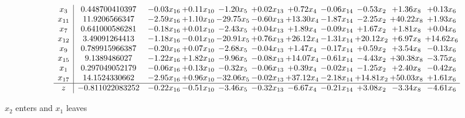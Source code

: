 \documentclass[9pt]{article}
\begin{document}
 \[\begin{array}{c| c c@{\hskip 2pt} c@{\hskip 2pt} c@{\hskip 2pt} c@{\hskip 2pt} c@{\hskip 2pt} c@{\hskip 2pt} c@{\hskip 2pt} c@{\hskip 2pt} c@{\hskip 2pt} }
 x_{3}   &  0.448700410397 & -0.03 x_{16} & +  0.11 x_{10} & -1.20 x_{5} & +  0.02 x_{13} & +  0.72 x_{4} & -0.06 x_{14} & -0.53 x_{2} & +  1.36 x_{8} & +  0.13 x_{6}\\
 x_{11}   &  11.9206566347 & -2.59 x_{16} & +  1.10 x_{10} & -29.75 x_{5} & -0.60 x_{13} & + 13.30 x_{4} & -1.87 x_{14} & -2.25 x_{2} & + 40.22 x_{8} & +  1.93 x_{6}\\
 x_{7}   &  0.641000586281 & -0.18 x_{16} & +  0.01 x_{10} & -2.43 x_{5} & +  0.04 x_{13} & +  1.89 x_{4} & -0.09 x_{14} & +  1.67 x_{2} & +  1.81 x_{8} & +  0.04 x_{6}\\
 x_{12}   &  3.49091264413 & -1.18 x_{16} & -0.01 x_{10} & -20.91 x_{5} & +  0.76 x_{13} & + 26.12 x_{4} & -1.31 x_{14} & + 20.12 x_{2} & +  6.97 x_{8} & + 14.62 x_{6}\\
 x_{9}   &  0.789915966387 & -0.20 x_{16} & +  0.07 x_{10} & -2.68 x_{5} & -0.04 x_{13} & +  1.47 x_{4} & -0.17 x_{14} & +  0.59 x_{2} & +  3.54 x_{8} & -0.13 x_{6}\\
 x_{15}   &  9.1389486027 & -1.22 x_{16} & +  1.82 x_{10} & -9.96 x_{5} & -0.08 x_{13} & + 14.07 x_{4} & -0.61 x_{14} & -4.43 x_{2} & + 30.38 x_{8} & -3.75 x_{6}\\
 x_{1}   &  0.297049052179 & -0.06 x_{16} & +  0.13 x_{10} & -0.32 x_{5} & -0.06 x_{13} & +  0.39 x_{4} & -0.02 x_{14} & -1.25 x_{2} & +  2.40 x_{8} & -0.42 x_{6}\\
 x_{17}   &  14.1524330662 & -2.95 x_{16} & +  0.96 x_{10} & -32.06 x_{5} & -0.02 x_{13} & + 37.12 x_{4} & -2.18 x_{14} & + 14.81 x_{2} & + 50.03 x_{8} & +  1.61 x_{6}\\
\hline
z    &  -0.811022083252 & -0.22 x_{16} & -0.51 x_{10} & -3.46 x_{5} & -0.32 x_{13} & -6.67 x_{4} & -0.21 x_{14} & +  3.08 x_{2} & -3.34 x_{8} & -4.61 x_{6}\\
\end{array}\]


 $ x_{2} $ enters and $ x_{1} $ leaves 
\end{document}

